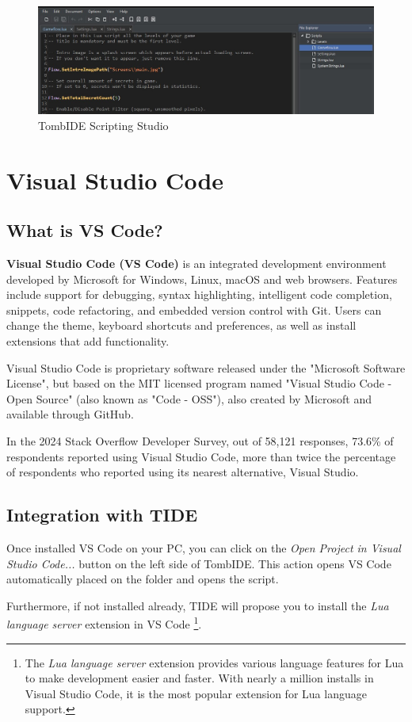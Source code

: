 \begin{figure}
    \centering
     \includegraphics[width=1\textwidth]{screenshots/19.jpg}
     \caption{TombIDE Scripting Studio}
     \label{fig:TIDEScriptingStudio} 
\end{figure}

\section{Visual Studio Code  }

\subsection{What is VS Code?}
\textbf{Visual Studio Code (VS Code)} is an integrated development environment developed by Microsoft for Windows, Linux, macOS and web browsers. Features include support for debugging, syntax highlighting, intelligent code completion, snippets, code refactoring, and embedded version control with Git. Users can change the theme, keyboard shortcuts and preferences, as well as install extensions that add functionality.

\par Visual Studio Code is proprietary software released under the "Microsoft Software License", but based on the MIT licensed program named "Visual Studio Code - Open Source" (also known as "Code - OSS"), also created by Microsoft and available through GitHub.

\par In the 2024 Stack Overflow Developer Survey, out of 58,121 responses, 73.6\% of respondents reported using Visual Studio Code, more than twice the percentage of respondents who reported using its nearest alternative, Visual Studio. \cite{VSCode_Wikipedia}

\subsection{Integration with TIDE}
Once installed VS Code on your PC, you can click on the \emph{Open Project in Visual Studio Code...} button on the left side of TombIDE. This action opens VS Code automatically placed on the  folder and opens the  script.
\par Furthermore, if not installed already, TIDE will propose you to install the \emph{Lua language server} extension in VS Code \footnote{The \emph{Lua language server} extension provides various language features for Lua to make development easier and faster. With nearly a million installs in Visual Studio Code, it is the most popular extension for Lua language support.}.

